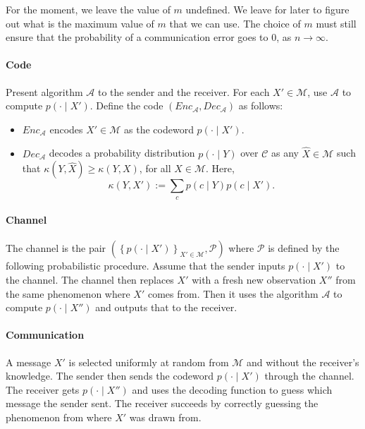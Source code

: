 For the moment, we leave the value of $m$ undefined. We leave for later to figure out what is the maximum value of $m$ that we can use. The choice of $m$ must still ensure that the probability of a communication error goes to 0, as $n \to \infty$.

\paragraph{Code} Present algorithm $\mathcal{A}$ to the sender and the receiver. For each $X' \in \mathcal{M}$, use $\mathcal{A}$ to compute $p(\cdot \mid X')$. Define the code $(\mathit{Enc}_{\mathcal{A}}, \mathit{Dec}_{\mathcal{A}})$ as follows:

\begin{itemize}
\item $\mathit{Enc}_{\mathcal{A}}$ encodes $X' \in \mathcal{M}$ as the codeword $p(\cdot \mid X')$.
\item $\mathit{Dec}_{\mathcal{A}}$ decodes a probability distribution $p(\cdot \mid Y)$ over $\mathcal{C}$ as any $\hat{X} \in \mathcal{M}$ such that $\kappa\left(Y, \hat{X}\right) \geq \kappa\left(Y, X\right)$, for all $X \in \mathcal{M}$. Here,
%
$$\kappa\left(Y, X'\right) := \sum_c p(c \mid Y)p(c \mid X').$$
%
\end{itemize}

\paragraph{Channel} The channel is the pair $\left(\left\{p(\cdot \mid X')\right\}_{X' \in \mathcal{M}}, \mathcal{P}\right)$ where $\mathcal{P}$ is defined by the following probabilistic procedure. Assume that the sender inputs $p(\cdot \mid X')$ to the channel. The channel then replaces $X'$ with a fresh new observation $X''$ from the same phenomenon where $X'$ comes from. Then it uses the algorithm $\mathcal{A}$ to compute $p(\cdot \mid X'')$ and outputs that to the receiver.

\paragraph{Communication} A message $X'$ is selected uniformly at random from $\mathcal{M}$ and without the receiver's knowledge. The sender then sends the codeword $p(\cdot \mid X')$ through the channel. The receiver gets $p(\cdot \mid X'')$ and uses the decoding function to guess which message the sender sent. The receiver succeeds by correctly guessing the phenomenon from where $X'$ was drawn from.

